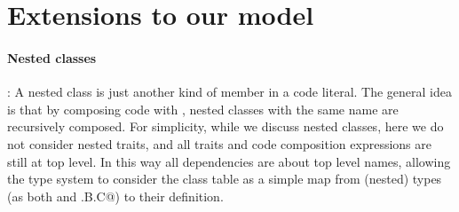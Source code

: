 \section{Extensions to our model}

\paragraph{Nested classes}:
A nested class is just another kind of member in a code literal.
The general idea is that by composing code with \use,
nested classes with the same name are recursively composed.
For simplicity, while we discuss nested classes,
here we do not consider nested traits,
and all traits and code composition expressions are still at top level.
In this way all dependencies are about top level names, allowing the type system 
to consider the class table as a simple map from (nested) types (as both \Q@A@ and \Q@A.B.C@) to their definition.





